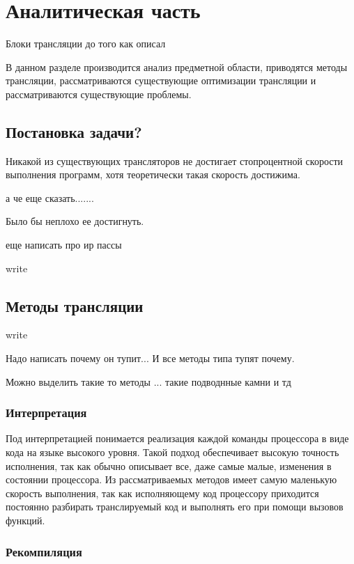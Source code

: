 \section{Аналитическая часть}

Блоки трансляции до того как описал

 
В данном разделе производится анализ предметной области, приводятся методы трансляции, рассматриваются существующие оптимизации трансляции и рассматриваются существующие проблемы.
 
\subsection{Постановка задачи?}
 
Никакой из существующих трансляторов не достигает стопроцентной скорости выполнения программ, хотя теоретически такая скорость достижима.
 
а че еще сказать.......

Было бы неплохо ее достигнуть.

еще написать про ир пассы

write

\subsection{Методы трансляции}

write

Надо написать почему он тупит... И все методы типа тупят почему.

Можно выделить такие то методы ... такие подводнные камни и тд

\subsubsection{Интерпретация}

Под интерпретацией понимается реализация каждой команды процессора в виде кода на языке высокого уровня. Такой подход обеспечивает высокую точность исполнения, так как обычно описывает все, даже самые малые, изменения в состоянии процессора. Из рассматриваемых методов имеет самую маленькую скорость выполнения, так как исполняющему код процессору приходится постоянно разбирать транслируемый код и выполнять его при помощи вызовов функций.

\subsubsection{Рекомпиляция}

